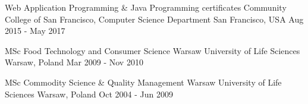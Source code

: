 

\begin{cventries}

  \cventry
    {Web Application Programming \& Java Programming certificates} %
    {Community College of San Francisco, Computer Science Department} %
    {San Francisco, USA} %
    {Aug 2015 - May 2017} %
    {}

  \cventry
    {MSc Food Technology and Consumer Science} %
    {Warsaw University of Life Sciences} %
    {Warsaw, Poland} %
    {Mar 2009 - Nov 2010} %
    {}

  \cventry
    {MSc Commodity Science \& Quality Management} %
    {Warsaw University of Life Sciences} %
    {Warsaw, Poland} %
    {Oct 2004 - Jun 2009} %
    {}

\end{cventries}
